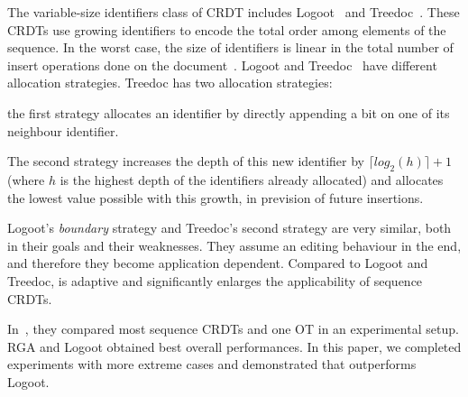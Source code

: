 The variable-size identifiers class of CRDT includes
Logoot~\cite{weiss2009logoot} and Treedoc~\cite{preguica2009commutative}. These
CRDTs use growing identifiers to encode the total order among elements of the
sequence. In the worst case, the size of identifiers is linear in the total
number of insert operations done on the
document~\cite{ahmed2011evaluating}. Logoot and
Treedoc~\cite{preguica2009commutative} have different allocation
strategies. Treedoc has two allocation strategies:
\begin{inparaenum}[(i)]
\item the first strategy allocates an identifier by directly appending a bit on
  one of its neighbour identifier.
\item The second strategy increases the depth of this new identifier by $\lceil
  log_2(h)\rceil +1 $ (where $h$ is the highest depth of the identifiers
  already allocated) and allocates the lowest value possible with this growth,
  in prevision of future insertions.
\end{inparaenum}

Logoot's \emph{boundary} strategy and Treedoc's second strategy are very
similar, both in their goals and their weaknesses. They assume an editing
behaviour in the end, and therefore they become application dependent.
Compared to Logoot and Treedoc, \NAME{} is adaptive and significantly enlarges
the applicability of sequence CRDTs.

In~\cite{ahmed2011evaluating}, they compared most sequence CRDTs and one OT in
an experimental setup. RGA and Logoot obtained best overall performances. In
this paper, we completed experiments with more extreme cases and demonstrated
that \NAME{} outperforms Logoot.

